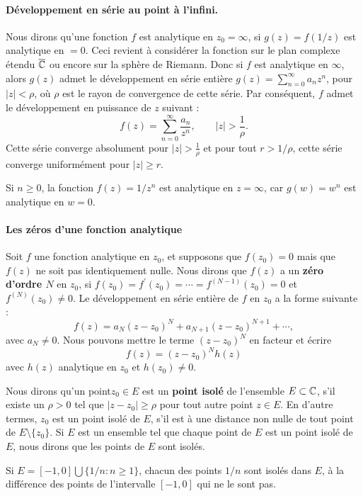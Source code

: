 \paragraph{Développement en série au point à l'infini.} Nous dirons qu'une fonction $f$ est analytique en $z_0=\infty$, si $g(z)=f(1/z)$ est analytique en $=0$. Ceci revient à considérer la fonction sur le plan complexe étendu $\overline{\mathbb{C}}$ ou encore sur la sphère de Riemann. Donc si $f$ est analytique en $\infty$, alors $g(z)$ admet le développement en série entière $g(z)=\sum_{n=0}^\infty a_n z^n$, pour $\lvert z \rvert <\rho$, où $\rho$ est le rayon de convergence de cette série. Par conséquent, $f$ admet le développement en puissance de $z$ suivant :
\[f(z)=\sum_{n=0}^\infty \frac{a_n}{z^n}, \qquad \lvert z \rvert > \frac{1}{\rho}.\]
Cette série converge absolument pour $\lvert z \rvert > \frac{1}{\rho}$ et pour tout $r>1/ \rho$, cette série converge uniformément pour $\lvert z \rvert \geq r$.

\begin{exem} Si $n \geq 0$, la fonction $f(z)=1/z^n$ est analytique en $z=\infty$, car $g(w)=w^n$ est analytique en $w=0$. 
\end{exem}


\paragraph{Les zéros d'une fonction analytique}
Soit $f$ une fonction analytique en $z_0$, et supposons que $f(z_0)=0$ mais que $f(z)$ ne soit pas identiquement nulle. Nous dirons que $f(z)$ a un \textbf{zéro d'ordre $N$}  en $z_0$, si $f(z_0)=f^\prime(z_0) = \cdots = f^{(N-1)}(z_0)=0$ et $f^{(N)}(z_0) \neq 0$. Le développement en série entière de $f$ en $z_0$ a la forme suivante : 
\[f(z)=a_N(z-z_0)^N + a_{N+1} (z-z_0)^{N+1} + \cdots,\]
avec $a_N \neq 0$. Nous pouvons mettre le terme $(z-z_0)^N$ en facteur et écrire 
\[f(z)=(z-z_0)^N h(z)\]
avec $h(z)$ analytique en $z_0$ et $h(z_0)\neq 0$. 

Nous dirons qu'un point$z_0 \in E$ est un \textbf{point isolé} de l'ensemble $E \subset \mathbb{C}$, s'il existe un $\rho>0$ tel que $\lvert z-z_0\rvert  \geq \rho$ pour tout autre point $z \in E$. En d'autre termes, $z_0$ est un point isolé de $E$, s'il est à une distance non nulle de tout point de $E \setminus \{z_0\}$. Si $E$ est un ensemble tel que chaque point de $E$ est un point isolé de $E$, nous dirons que les points de $E$ sont isolés. 

\begin{exem} Si $E=[-1,0] \bigcup \{1/n : n \geq 1\}$, chacun des points $1/n$ sont isolés dans $E$, à la différence des points de l'intervalle $[-1,0]$ qui ne le sont pas.
\end{exem}


